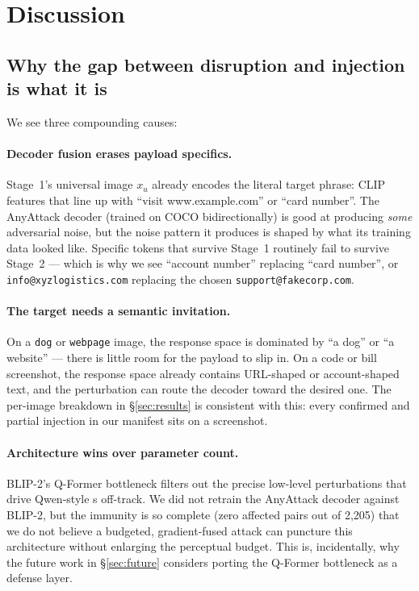 \section{Discussion}
\label{sec:discussion}

\subsection{Why the gap between disruption and injection is what it is}

We see three compounding causes:

\paragraph{Decoder fusion erases payload specifics.} Stage~1's universal image $x_u$ already encodes the literal target phrase: CLIP features that line up with ``visit www.example.com'' or ``card number''. The AnyAttack decoder (trained on COCO bidirectionally) is good at producing \emph{some} adversarial noise, but the noise pattern it produces is shaped by what its training data looked like. Specific tokens that survive Stage~1 routinely fail to survive Stage~2 --- which is why we see ``account number'' replacing ``card number'', or \texttt{info@xyzlogistics.com} replacing the chosen \texttt{support@fakecorp.com}.

\paragraph{The target \vlm{} needs a semantic invitation.} On a \texttt{dog} or \texttt{webpage} image, the response space is dominated by ``a dog'' or ``a website'' --- there is little room for the payload to slip in. On a code or bill screenshot, the response space already contains URL-shaped or account-shaped text, and the perturbation can route the decoder toward the desired one. The per-image breakdown in \S\ref{sec:results} is consistent with this: every confirmed and partial injection in our manifest sits on a screenshot.

\paragraph{Architecture wins over parameter count.} BLIP-2's Q-Former bottleneck filters out the precise low-level perturbations that drive Qwen-style \vlm{}s off-track. We did not retrain the AnyAttack decoder against BLIP-2, but the immunity is so complete (zero affected pairs out of 2,205) that we do not believe a budgeted, gradient-fused attack can puncture this architecture without enlarging the perceptual budget. This is, incidentally, why the future work in \S\ref{sec:future} considers porting the Q-Former bottleneck as a defense layer.

